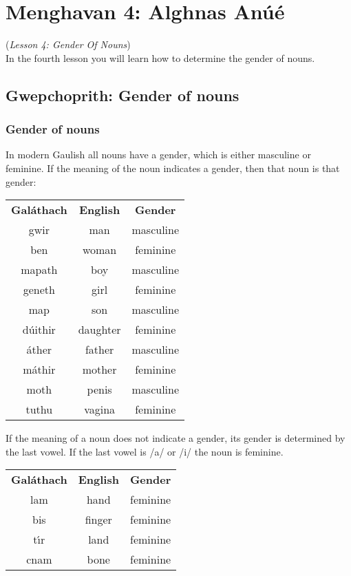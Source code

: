 \section{Menghavan 4: Alghnas An\'{u}\'{e}}
(\textit{Lesson 4: Gender Of Nouns})\\

In the fourth lesson you will learn how to determine the gender of nouns.

\subsection{Gwepchoprith: Gender of nouns}
\subsubsection{Gender of nouns}

In modern Gaulish all nouns have a gender, which is either masculine or feminine. If the meaning of the noun indicates a gender, then that noun is that gender:
\begin{table}[H]
\centering
\begin{tabular}{ccc}
  \toprule
  \textbf{Gal\'{a}thach} & \textbf{English} & \textbf{Gender}\\
  \cmidrule(lr){1-1}\cmidrule(lr){2-2}\cmidrule(lr){3-3}
  gwir & man & masculine\\
  ben & woman & feminine\\
  mapath & boy & masculine\\
  geneth & girl & feminine\\
  map & son & masculine\\
  d\'{u}ithir & daughter & feminine\\
  \'{a}ther & father & masculine\\
  m\'{a}thir & mother & feminine\\
  moth & penis & masculine\\
  tuthu & vagina & feminine\\
  \bottomrule
\end{tabular}
\label{example_gender_meaning}
\end{table}

If the meaning of a noun does not indicate a gender, its gender is determined by the last vowel. If the last vowel is /a/ or /i/ the noun is feminine.
\begin{table}[H]
\centering
\begin{tabular}{ccc}
  \toprule
  \textbf{Gal\'{a}thach} & \textbf{English} & \textbf{Gender}\\
  \cmidrule(lr){1-1}\cmidrule(lr){2-2}\cmidrule(lr){3-3}
  lam & hand & feminine\\
  bis & finger & feminine\\
  t\'{\i}r & land & feminine\\
  cnam & bone & feminine\\
  \bottomrule
\end{tabular}
\label{example_gender_last_vowel_ai}
\end{table}

